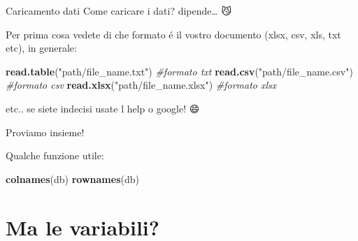 \documentclass[
  ignorenonframetext,
]{beamer}
\newenvironment{Shaded}{\begin{snugshade}}{\end{snugshade}}
\newcommand{\CommentTok}[1]{\textcolor[rgb]{0.56,0.35,0.01}{\textit{#1}}}
\newcommand{\KeywordTok}[1]{\textcolor[rgb]{0.13,0.29,0.53}{\textbf{#1}}}
\newcommand{\NormalTok}[1]{#1}
\newcommand{\StringTok}[1]{\textcolor[rgb]{0.31,0.60,0.02}{#1}}
\begin{document}
\begin{frame}[fragile]{Caricamento dati}
\protect\hypertarget{caricamento-dati}{}
Come caricare i dati? dipende\ldots{} 😼

Per prima cosa vedete di che formato é il vostro documento (xlsx, csv,
xls, txt etc), in generale:

\begin{Shaded}
\begin{Highlighting}[]
\KeywordTok{read.table}\NormalTok{(}\StringTok{"path/file\_name.txt"}\NormalTok{) }\CommentTok{\#formato txt}
\KeywordTok{read.csv}\NormalTok{(}\StringTok{"path/file\_name.csv"}\NormalTok{) }\CommentTok{\#formato csv}
\KeywordTok{read.xlsx}\NormalTok{(}\StringTok{"path/file\_name.xlsx"}\NormalTok{) }\CommentTok{\#formato xlsx}
\end{Highlighting}
\end{Shaded}

etc.. se siete indecisi usate l help o google! 😄

Proviamo insieme!

Qualche funzione utile:

\begin{Shaded}
\begin{Highlighting}[]
\KeywordTok{colnames}\NormalTok{(db) }
\KeywordTok{rownames}\NormalTok{(db)}
\end{Highlighting}
\end{Shaded}
\end{frame}

\hypertarget{ma-le-variabili}{%
\section{Ma le variabili?}\label{ma-le-variabili}}
\end{document}

